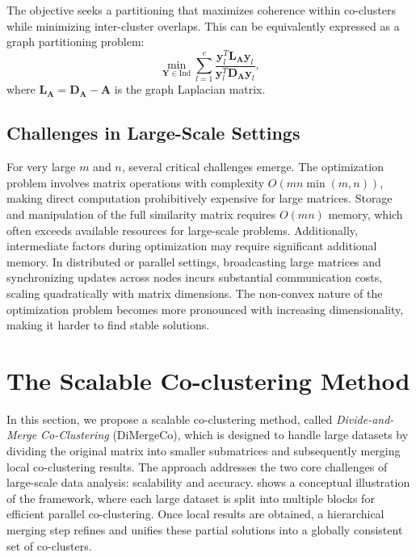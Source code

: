 \documentclass[journal]{IEEEtran}
\begin{document}
The objective seeks a partitioning that maximizes coherence within co-clusters while minimizing inter-cluster overlaps. This can be equivalently expressed as a graph partitioning problem:
\begin{equation}
    \min_{\mathbf{Y} \in \text{Ind}} \sum_{l=1}^c \frac{\mathbf{y}_l^T \mathbf{L}_\mathbf{A}\mathbf{y}_l}{\mathbf{y}_l^T \mathbf{D}_\mathbf{A} \mathbf{y}_l},
\end{equation}
where $\mathbf{L}_\mathbf{A} = \mathbf{D}_\mathbf{A} - \mathbf{A}$ is the graph Laplacian matrix.

\subsection{Challenges in Large-Scale Settings}
For very large $m$ and $n$, several critical challenges emerge. The optimization problem involves matrix operations with complexity $O(mn\min(m,n))$, making direct computation prohibitively expensive for large matrices. Storage and manipulation of the full similarity matrix requires $O(mn)$ memory, which often exceeds available resources for large-scale problems. Additionally, intermediate factors during optimization may require significant additional memory. In distributed or parallel settings, broadcasting large matrices and synchronizing updates across nodes incurs substantial communication costs, scaling quadratically with matrix dimensions. The non-convex nature of the optimization problem becomes more pronounced with increasing dimensionality, making it harder to find stable solutions.

\section{The Scalable Co-clustering Method}
\label{sec:proposed_model}

In this section, we propose a scalable co-clustering method, called \emph{Divide-and-Merge Co-Clustering } (DiMergeCo), which is designed to handle large datasets by dividing the original matrix into smaller submatrices and subsequently merging local co-clustering results. The approach addresses the two core challenges of large-scale data analysis: scalability and accuracy.  shows a conceptual illustration of the framework, where each large dataset is split into multiple blocks for efficient parallel co-clustering. Once local results are obtained, a hierarchical merging step refines and unifies these partial solutions into a globally consistent set of co-clusters.
\end{document}
